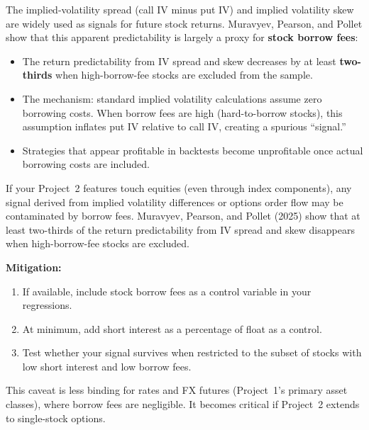 \begin{keyresult}
The implied-volatility spread (call IV minus put IV) and implied
volatility skew are widely used as signals for future stock returns.
Muravyev, Pearson, and Pollet show that this apparent predictability
is largely a proxy for \textbf{stock borrow fees}:
\begin{itemize}[nosep]
  \item The return predictability from IV spread and skew decreases
        by at least \textbf{two-thirds} when high-borrow-fee stocks
        are excluded from the sample.
  \item The mechanism: standard implied volatility calculations
        assume zero borrowing costs.  When borrow fees are high
        (hard-to-borrow stocks), this assumption inflates put IV
        relative to call IV, creating a spurious ``signal.''
  \item Strategies that appear profitable in backtests become
        unprofitable once actual borrowing costs are included.
\end{itemize}
\end{keyresult}

\begin{warning}
If your Project~2 features touch equities (even through index
components), any signal derived from implied volatility differences
or options order flow may be contaminated by borrow fees.
Muravyev, Pearson, and Pollet (2025) show that at least two-thirds
of the return predictability from IV spread and skew disappears when
high-borrow-fee stocks are excluded.

\textbf{Mitigation:}
\begin{enumerate}[nosep]
  \item If available, include stock borrow fees as a control variable
        in your regressions.
  \item At minimum, add short interest as a percentage of float as a
        control.
  \item Test whether your signal survives when restricted to the
        subset of stocks with low short interest and low borrow fees.
\end{enumerate}
This caveat is less binding for rates and FX futures (Project~1's
primary asset classes), where borrow fees are negligible.  It becomes
critical if Project~2 extends to single-stock options.
\end{warning}

